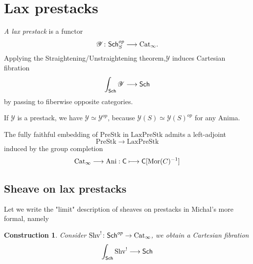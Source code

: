 \documentclass[oneside]{amsart}
\newcommand{\prestk}{\mathrm{PreStk}}
\newcommand{\laxprestk}{\mathrm{LaxPreStk} }
\newcommand{\Cat}{\mathrm{Cat}}
\newcommand{\Ani}{\mathrm{Ani}}
\newtheorem{construction}[theorem]{Construction}
\begin{document}
\section{Lax prestacks}
\begin{definition}\cite[Paragraph~2.1]{abott}
    \emph{A lax prestack} is a functor \[   
    \mathcal{Y} \colon  \Sch_S^{op} \to \Cat_\infty.
    \] Applying the Straightening/Unstraightening theorem,$\mathcal{Y}$ induces Cartesian fibration \[ 
    \int_\Sch \mathcal{Y} \to \Sch
    \]
    by passing to fiberwise opposite categories.
\end{definition}

\begin{remark}
    If $\mathcal{Y}$ is a prestack, we have $\mathcal{Y} \simeq \mathcal{Y}^{op}$, because $\mathcal{Y}(S) \simeq \mathcal{Y}(S)^{op}$ for any Anima.
\end{remark}

\begin{proposition}
The fully faithful embedding of $\prestk$ in $\laxprestk$ admits a left-adjoint    \[
    \prestk \to \laxprestk
\] induced by the group completion\[    
    \Cat_\infty \to \Ani \space: \space \C \mapsto \C[\mathrm{Mor}(C)^{-1}]
\]
\end{proposition}

\subsection{Sheave on lax prestacks}
Let we write the "limit" description of sheaves on prestacks in Michal's more formal, namely

\begin{construction}
    Consider $\Shv^!\colon \Sch^{op} \to \Cat_\infty$, we obtain a Cartesian fibration \[   
    \int_{\Sch}  \Shv^! \to \Sch
    \]
\end{construction}
\end{document}
